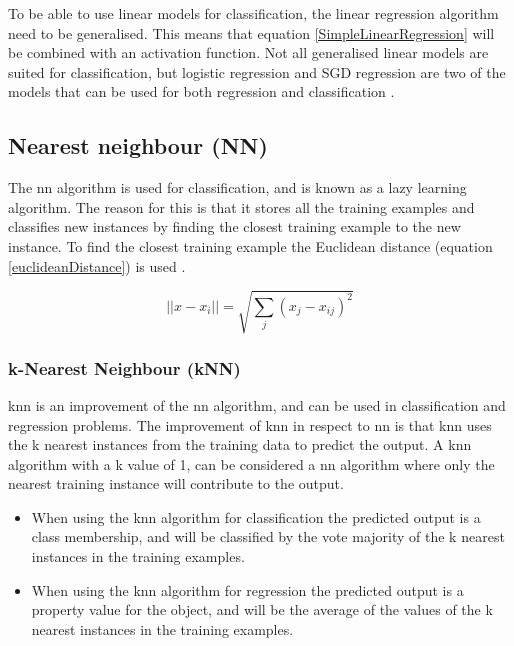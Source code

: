 \documentclass[english, a4paper]{report}
\begin{document}
{{{            To be able to use linear models for classification, the linear regression algorithm need to be generalised. This means that equation \ref{SimpleLinearRegression} will be combined with an activation function. Not all generalised linear models are suited for classification, but logistic regression and SGD regression are two of the models that can be used for both regression and classification \cite{scikitGeneralisedLinMod}. 
        }
        
        \subsection{Nearest neighbour (NN)} \label{nearest-neighbour}
        {
            The \gls{nn} algorithm is used for classification, and is known as a lazy learning algorithm. The reason for this is that it stores all the training examples and classifies new instances by finding the closest training example to the new instance. To find the closest training example the Euclidean distance (equation \ref{euclideanDistance}) is used \cite{nearestneighbour}.
            
            \begin{equation}\label{euclideanDistance}
                ||x-x_i||=\sqrt{\sum_j(x_j-x_{ij})^2}
            \end{equation}
            
            \subsubsection{k-Nearest Neighbour (kNN)}\label{knnTheory}
            {
                \gls{knn} is an improvement of the \gls{nn} algorithm, and can be used in classification and regression problems. The improvement of \gls{knn} in respect to \gls{nn} is that \gls{knn} uses the k nearest instances from the training data to predict the output. A \gls{knn} algorithm with a k value of 1, can be considered a \gls{nn} algorithm where only the nearest training instance will contribute to the output.\par
                
                \begin{itemize}
                    \item When using the \gls{knn} algorithm for classification the predicted output is a class membership, and will be classified by the vote majority of the k nearest instances in the training examples.
                    \item When using the \gls{knn} algorithm for regression the predicted output is a property value for the object, and will be the average of the values of the k nearest instances in the training examples.
                \end{itemize}
                
}}}}
\end{document}
